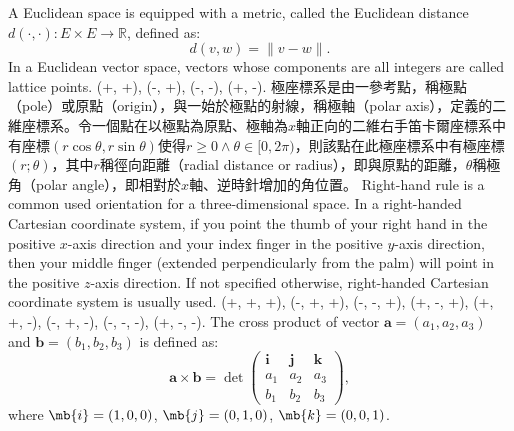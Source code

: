 \documentclass[a4paper,12pt]{report}
\begin{document}
A Euclidean space is equipped with a metric, called the Euclidean distance $d(\cdot,\cdot)\colon E\times E\to\mathbb{R}$, defined as:
\[d(v,w)=\|v-w\|.\]
In a Euclidean vector space, vectors whose components are all integers are called lattice points.
(+, +), (-, +), (-, -), (+, -).
極座標系是由一參考點，稱極點（pole）或原點（origin），與一始於極點的射線，稱極軸（polar axis），定義的二維座標系。令一個點在以極點為原點、極軸為$x$軸正向的二維右手笛卡爾座標系中有座標$(r\cos\theta,r\sin\theta)$使得$r\geq 0\land\theta\in[0,2\pi)$，則該點在此極座標系中有極座標$(r;\theta)$，其中$r$稱徑向距離（radial distance or radius），即與原點的距離，$\theta$稱極角（polar angle），即相對於$x$軸、逆時針增加的角位置。
Right-hand rule is a common used orientation for a three-dimensional space. In a right-handed Cartesian coordinate system, if you point the thumb of your right hand in the positive $x$-axis direction and your index finger in the positive $y$-axis direction, then your middle finger (extended perpendicularly from the palm) will point in the positive $z$-axis direction. If not specified otherwise, right-handed Cartesian coordinate system is usually used.
(+, +, +), (-, +, +), (-, -, +), (+, -, +), (+, +, -), (-, +, -), (-, -, -), (+, -, -).
The cross product of vector $\mathbf{a}=(a_1,a_2,a_3)$ and $\mathbf{b}=(b_1,b_2,b_3)$ is defined as:
\[\mathbf{a}\times\mathbf{b}=\det\begin{pmatrix}\mathbf{i} & \mathbf{j} & \mathbf{k}\\a_1 & a_2 & a_3\\b_1 & b_2 & b_3\end{pmatrix},\]
where $\mb{i}=(1,0,0)$, $\mb{j}=(0,1,0)$, $\mb{k}=(0,0,1)$.
\end{document}

